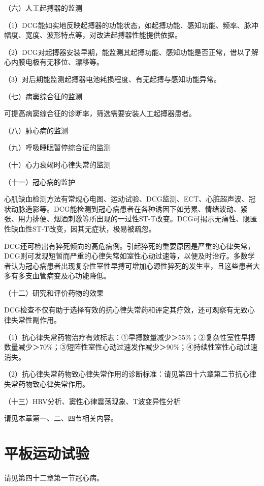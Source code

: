 （六）人工起搏器的监测

（1）DCG能如实地反映起搏器的功能状态，如起搏功能、感知功能、频率、脉冲幅度、宽度、波形特点等，对改进起搏器性能提供依据。

（2）DCG对起搏器安装早期，能监测其起搏功能、感知功能是否正常，借以了解心内膜电极有无移位、漂移等。

（3）对后期能监测起搏器电池耗损程度、有无起搏与感知功能异常。

（七）病窦综合征的监测

可提高病窦综合征的诊断率，筛选需要安装人工起搏器患者。

（八）肺心病的监测

（九）呼吸睡眠暂停综合征的监测

（十）心力衰竭时心律失常的监测

（十一）冠心病的监护

心肌缺血检测方法有常规心电图、运动试验、DCG监测、ECT、心脏超声波、冠状动脉造影等。DCG能检测到冠心病患者在各种诱因下如劳累、情绪波动、紧张、用力排便、烟酒刺激等所出现的一过性ST-T改变。DCG可揭示无痛性、隐匿性缺血性ST-T改变，因其无症状，极易被疏忽。

DCG还可检出有猝死倾向的高危病例。引起猝死的重要原因是严重的心律失常，DCG则可发现短暂而严重的心律失常如室性心动过速等，以便及时治疗。多数学者认为冠心病患者出现复杂性室性早搏可增加心源性猝死的发生率，且这些患者大多有多支血管病变及心功能降低。

（十二）研究和评价药物的效果

DCG检查不仅有助于选择有效的抗心律失常药和评定其疗效，还可观察有无致心律失常性副作用。

（1）抗心律失常药物治疗有效标志：①早搏数量减少＞55\%；②复杂性室性早搏数量减少＞70\%；③短阵性室性心动过速发作减少＞90\%；④持续性室性心动过速消失。

（2）抗心律失常药物致心律失常作用的诊断标准：请见第四十六章第二节抗心律失常药物致心律失常作用。

（十三）HRV分析、窦性心律震荡现象、T波变异性分析

请见本章第一、二、四节相关内容。

\protect\hypertarget{text00056.htmlux5cux23subid675}{}{}

\section{平板运动试验}

请见第四十二章第一节冠心病。

\protect\hypertarget{text00057.html}{}{}

